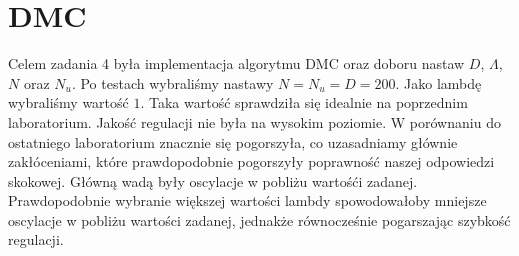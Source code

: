 \chapter{DMC}
Celem zadania 4 była implementacja algorytmu DMC oraz doboru nastaw $D$, $\Lambda$,
$N$ oraz $N_u$. Po testach wybraliśmy nastawy $N=N_u=D=200$. Jako lambdę wybraliśmy wartość $1$.
Taka wartość sprawdziła się idealnie na poprzednim laboratorium.
Jakość regulacji nie była na wysokim poziomie. W porównaniu do ostatniego
laboratorium znacznie się pogorszyła, co uzasadniamy głównie zakłóceniami,
które prawdopodobnie pogorszyły poprawność naszej odpowiedzi skokowej.
Główną wadą były oscylacje w pobliżu wartośći zadanej. Prawdopodobnie wybranie
większej wartości lambdy spowodowałoby mniejsze oscylacje w pobliżu wartości zadanej,
jednakże równocześnie pogarszając szybkość regulacji.
